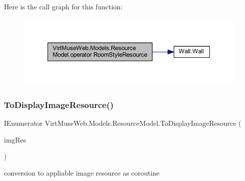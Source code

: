 Here is the call graph for this function\+:
\nopagebreak
\begin{figure}[H]
\begin{center}
\leavevmode
\includegraphics[width=348pt]{class_virt_muse_web_1_1_models_1_1_resource_model_ad65176cbe98193e7e8240253148e42fe_cgraph}
\end{center}
\end{figure}
\mbox{\label{class_virt_muse_web_1_1_models_1_1_resource_model_a4ff757b0ed17663d3d503dbb4decff7b}} 
\subsubsection{\texorpdfstring{To\+Display\+Image\+Resource()}{ToDisplayImageResource()}}
{\footnotesize\ttfamily I\+Enumerator Virt\+Muse\+Web.\+Models.\+Resource\+Model.\+To\+Display\+Image\+Resource (\begin{DoxyParamCaption}\item[{\mbox{\hyperlink{class_display_image_resource}{Display\+Image\+Resource}}}]{img\+Res }\end{DoxyParamCaption})}



conversion to appliable image resource as coroutine 


